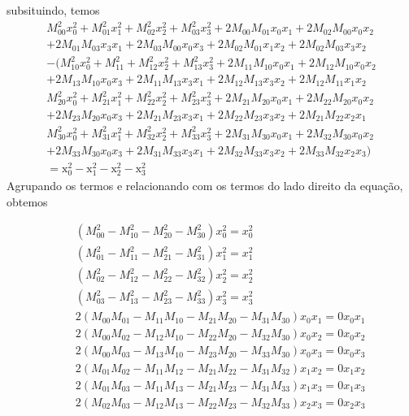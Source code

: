 \documentclass[10pt,a4paper]{article}
\begin{document}
\begin{enumerate}
	subsituindo, temos
	\begin{equation}\nonumber
		\begin{split}
			M_{00}^2 x_0^2 +M_{01}^2 x_1^2+M_{02}^2x_2^2+M_{03}^2 x_3^2+ 2M_{00}M_{01} x_0x_1+2M_{02}M_{00} x_0 x_2\\+2M_{01}M_{03} x_3 x_1+2M_{03}M_{00} x_0 x_3+2M_{02}M_{01} x_1 x_2+2M_{02}M_{03} x_3 x_2 \\
			-(M_{10}^2 x_0^2 + M_{11}^2+M_{12}^2 x_2^2+M_{13}^2 x_3^2+2M_{11}M_{10} x_0 x_1+2M_{12} M_{10} x_0x_2\\+2M_{13}M_{10} x_0 x_3+2M_{11}M_{13} x_3 x_1+2M_{12} M_{13} x_3x_2+2M_{12}M_{11} x_1 x_2\\
			M_{20}^2 x_0^2 + M_{21}^2 x_1^2+M_{22}^2 x_2^2+M_{23}^2 x_3^2	+2 M_{21}M_{20} x_0 x_1+2M_{22} M_{20}
			x_0x_2\\+2M_{23} M_{20} x_0x_3+2M_{21} M_{23} x_3x_1+2M_{22}M_{23} x_3 x_2+2 M_{21} M_{22} x_2x_1\\
			M_{30}^2 x_0^2 + M_{31}^2 x_1^2+M_{32}^2 x_2^2+M_{33}^2 x_3^2+2M_{31}M_{30} x_0 x_1+2M_{32} M_{30} x_0x_2\\+2M_{33}M_{30} x_0 x_3+2 M_{31} M_{33} x_3x_1+2M_{32}M_{33} x_3 x_2+2M_{33}M_{32} x_2 x_3) \\
			= \text{x}^2_0 -  \text{x}^2_1 -  \text{x}^2_2 -  \text{x}^2_3
		\end{split}
	\end{equation}
	Agrupando os termos e relacionando com os termos do lado direito da equação, obtemos
	
	\begin{eqnarray}
		&& (M_{00}^2-M_{10}^2-M_{20}^2-M_{30}^2)x^2_0 = x^2_0\nonumber \\
		&& (M_{01}^2-M_{11}^2-M_{21}^2-M_{31}^2)x^2_1 = x^2_1\nonumber \\
		&& (M_{02}^2-M_{12}^2-M_{22}^2-M_{32}^2)x^2_2 = x^2_2\nonumber \\
		&& (M_{03}^2-M_{13}^2-M_{23}^2-M_{33}^2)x^2_3 = x^2_3\nonumber \\
		&& 2(M_{00}M_{01}-M_{11}M_{10}-M_{21}M_{20}-M_{31}M_{30})x_0x_1 = 0 x_0x_1\nonumber \\
		&&2(M_{00}M_{02}- M_{12}M_{10}-M_{22}M_{20}-M_{32}M_{30})x_0x_2 = 0 x_0x_2\nonumber \\
		&&2(M_{00}M_{03}- M_{13}M_{10}-M_{23}M_{20}-M_{33}M_{30})x_0x_3 = 0 x_0x_3\nonumber \\
		&&2(M_{01}M_{02}- M_{11}M_{12}-M_{21}M_{22}- M_{31}M_{32})x_1x_2 = 0x_1x_2\nonumber \\
		&& 2(M_{01}M_{03}-M_{11}M_{13}-M_{21}M_{23}-M_{31}M_{33})x_1x_3 = 0 x_1x_3\nonumber \\
		&& 2(M_{02}M_{03}-M_{12}M_{13}-M_{22}M_{23}-M_{32}M_{33})x_2x_3 = 0 x_2x_3 \nonumber
	\end{eqnarray}


\end{enumerate}
\end{document}
